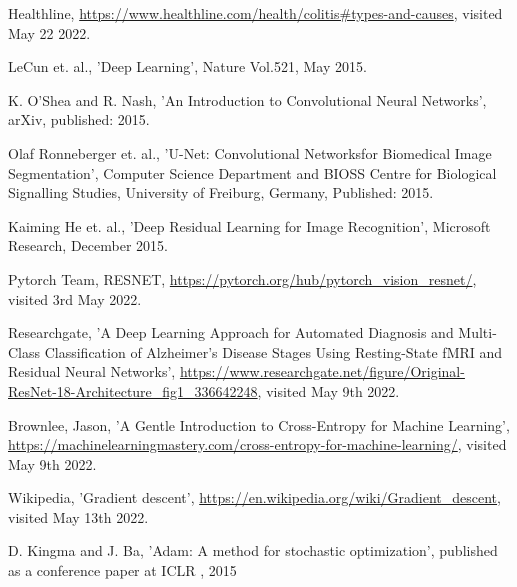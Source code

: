 \documentclass{article}                                                        %
\begin{document}
\begin{titlepage}
		
    \newpage                %
    \setcounter{page}{1}    %

\end{titlepage}
{\fontsize{10}{14}\selectfont







\newpage
\begin{thebibliography}{9}
	Healthline, \url{https://www.healthline.com/health/colitis#types-and-causes}, visited May 22 2022.
	
	LeCun et. al., 'Deep Learning', Nature Vol.521, May 2015.
	
	K. O'Shea and R. Nash, 'An Introduction to Convolutional Neural Networks', arXiv, published: 2015.
	
	Olaf Ronneberger et. al., ’U-Net: Convolutional Networksfor Biomedical Image Segmentation’, Computer Science Department and BIOSS Centre for Biological Signalling Studies, University of Freiburg, Germany, Published: 2015.
	
	Kaiming He et. al., 'Deep Residual Learning for Image Recognition', Microsoft Research, December 2015.
	
	Pytorch Team, RESNET, \url{https://pytorch.org/hub/pytorch_vision_resnet/}, visited 3rd May 2022.
	
	Researchgate, 'A Deep Learning Approach for Automated Diagnosis and Multi-Class Classification of Alzheimer’s Disease Stages Using Resting-State fMRI and Residual Neural Networks', \url{https://www.researchgate.net/figure/Original-ResNet-18-Architecture_fig1_336642248}, visited May 9th 2022.
	
	Brownlee, Jason, 'A Gentle Introduction to Cross-Entropy for Machine Learning', \url{https://machinelearningmastery.com/cross-entropy-for-machine-learning/}, visited May 9th 2022.
	
	Wikipedia, 'Gradient descent', \url{https://en.wikipedia.org/wiki/Gradient_descent}, visited May 13th 2022.
	
	D. Kingma and J. Ba, 'Adam: A method for stochastic optimization', published as a conference paper at ICLR , 2015
	

\end{thebibliography}}
\end{document}
